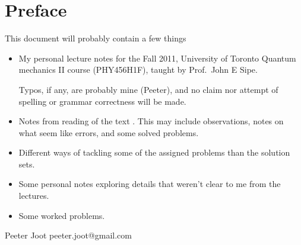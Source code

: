 \chapter*{Preface}\normalsize

This document will probably contain a few things

\begin{itemize}
\item My personal lecture notes for the Fall 2011, University of Toronto Quantum mechanics II course (PHY456H1F), taught by Prof.\ John E Sipe.

Typos, if any, are probably mine (Peeter), and no claim nor attempt of spelling or grammar correctness will be made.

\item Notes from reading of the text \citep{desai2009quantum}.  This may include observations, notes on what seem like errors, and some solved problems.

\item Different ways of tackling some of the assigned problems than the solution sets.

\item Some personal notes exploring details that weren't clear to me from the lectures.

\item Some worked problems.

\end{itemize}

Peeter Joot  \quad peeter.joot@gmail.com 

